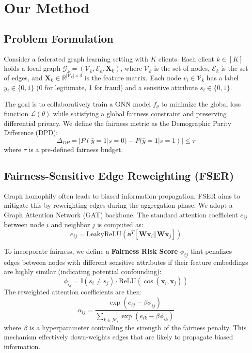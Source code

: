 \section{Our Method} \label{sec:method}

\subsection{Problem Formulation}
Consider a federated graph learning setting with $K$ clients. Each client $k \in [K]$ holds a local graph $\mathcal{G}_k = (\mathcal{V}_k, \mathcal{E}_k, \mathbf{X}_k)$, where $\mathcal{V}_k$ is the set of nodes, $\mathcal{E}_k$ is the set of edges, and $\mathbf{X}_k \in \mathbb{R}^{|\mathcal{V}_k| \times d}$ is the feature matrix. Each node $v_i \in \mathcal{V}_k$ has a label $y_i \in \{0, 1\}$ (0 for legitimate, 1 for fraud) and a sensitive attribute $s_i \in \{0, 1\}$.

The goal is to collaboratively train a GNN model $f_\theta$ to minimize the global loss function $\mathcal{L}(\theta)$ while satisfying a global fairness constraint and preserving differential privacy. We define the fairness metric as the Demographic Parity Difference (DPD):
\begin{equation}
\Delta_{DP} = |P(\hat{y}=1 | s=0) - P(\hat{y}=1 | s=1)| \leq \tau
\end{equation}
where $\tau$ is a pre-defined fairness budget.

\subsection{Fairness-Sensitive Edge Reweighting (FSER)}
Graph homophily often leads to biased information propagation. FSER aims to mitigate this by reweighting edges during the aggregation phase. We adopt a Graph Attention Network (GAT) backbone. The standard attention coefficient $e_{ij}$ between node $i$ and neighbor $j$ is computed as:
\begin{equation}
e_{ij} = \text{LeakyReLU}(\mathbf{a}^T [\mathbf{W}\mathbf{x}_i || \mathbf{W}\mathbf{x}_j])
\end{equation}

To incorporate fairness, we define a \textbf{Fairness Risk Score} $\phi_{ij}$ that penalizes edges between nodes with different sensitive attributes if their feature embeddings are highly similar (indicating potential confounding):
\begin{equation}
\phi_{ij} = \mathbb{I}(s_i \neq s_j) \cdot \text{ReLU}(\cos(\mathbf{x}_i, \mathbf{x}_j))
\end{equation}
The reweighted attention coefficients are then:
\begin{equation}
\alpha_{ij} = \frac{\exp(e_{ij} - \beta \phi_{ij})}{\sum_{k \in \mathcal{N}_i} \exp(e_{ik} - \beta \phi_{ik})}
\end{equation}
where $\beta$ is a hyperparameter controlling the strength of the fairness penalty. This mechanism effectively down-weights edges that are likely to propagate biased information.

